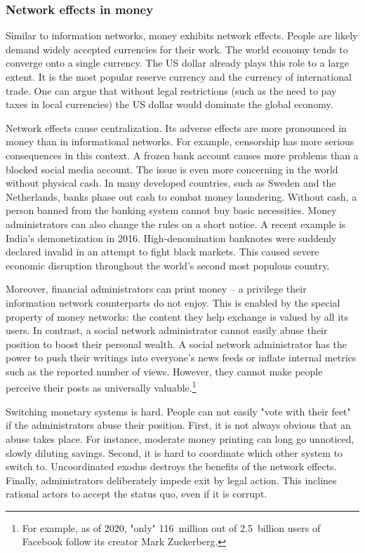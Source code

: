 \subsubsection*{Network effects in money}

Similar to information networks, money exhibits network effects.
People are likely demand widely accepted currencies for their work.
The world economy tends to converge onto a single currency.
The US dollar already plays this role to a large extent.
It is the most popular reserve currency and the currency of international trade.
One can argue that without legal restrictions (such as the need to pay taxes in local currencies) the US dollar would dominate the global economy.

Network effects cause centralization.
Its adverse effects are more pronounced in money than in informational networks.
For example, censorship has more serious consequences in this context.
A frozen bank account causes more problems than a blocked social media account.
The issue is even more concerning in the world without physical cash.
In many developed countries, such as Sweden and the Netherlands, banks phase out cash to combat money laundering.
Without cash, a person banned from the banking system cannot buy basic necessities.
Money administrators can also change the rules on a short notice.
A recent example is India's demonetization in 2016.
High-denomination banknotes were suddenly declared invalid in an attempt to fight black markets.
This caused severe economic disruption throughout the world's second most populous country.

Moreover, financial administrators can print money -- a privilege their information network counterparts do not enjoy.
This is enabled by the special property of money networks: the content they help exchange is valued by all its users.
In contrast, a social network administrator cannot easily abuse their position to boost their personal wealth.
A social network administrator has the power to push their writings into everyone's news feeds or inflate internal metrics such as the reported number of views.
However, they cannot make people perceive their posts as universally valuable.\footnote{For example, as of 2020, "only" 116~million out of 2.5~billion users of Facebook follow its creator Mark Zuckerberg.}

Switching monetary systems is hard.
People can not easily "vote with their feet" if the administrators abuse their position.
First, it is not always obvious that an abuse takes place.
For instance, moderate money printing can long go unnoticed, slowly diluting savings.
Second, it is hard to coordinate which other system to switch to.
Uncoordinated exodus destroys the benefits of the network effects.
Finally, administrators deliberately impede exit by legal action.
This inclines rational actors to accept the status quo, even if it is corrupt.

